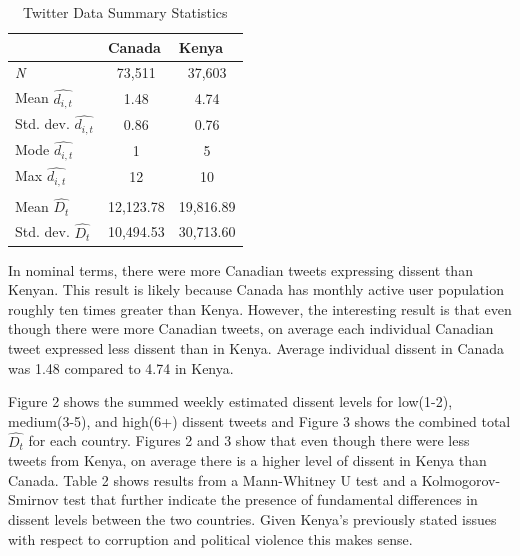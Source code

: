 \documentclass[12pt]{article}
\begin{document}
\begin{spacing}{1.5}
\begin{table}[]
\begin{spacing}{1}
\centering
\begin{tabular}{lcc}
\toprule
\multicolumn{1}{l}{} & \multicolumn{1}{l}{\textbf{Canada}} & \multicolumn{1}{l}{\textbf{Kenya}} \\ \hline
\textit{N} & 73,511 & 37,603 \\
Mean $\hat{d_{i,t}}$ & 1.48 & 4.74 \\
Std. dev. $\hat{d_{i,t}}$ & 0.86 & 0.76 \\
Mode $\hat{d_{i,t}}$ & 1 & 5 \\
Max $\hat{d_{i,t}}$ & 12 & 10 \\
& & \\
Mean $\hat{D_t}$ & 12,123.78 & 19,816.89 \\
Std. dev. $\hat{D_t}$ & 10,494.53 & 30,713.60 \\
\hline
\end{tabular}
\caption{Twitter Data Summary Statistics}
\end{spacing}
\end{table}

In nominal terms, there were more Canadian tweets expressing dissent than Kenyan. This result is likely because Canada has monthly active user population roughly ten times greater than Kenya. However, the interesting result is that even though there were more Canadian tweets, on average each individual Canadian tweet expressed less dissent than in Kenya. Average individual dissent in Canada was 1.48 compared to 4.74 in Kenya. 

Figure 2 shows the summed weekly estimated dissent levels for low(1-2), medium(3-5), and high(6+) dissent tweets and Figure 3 shows the combined total $\hat{D_t}$ for each country. Figures 2 and 3 show that even though there were less tweets from Kenya, on average there is a higher level of dissent in Kenya than Canada. Table 2 shows results from a Mann-Whitney U test and a Kolmogorov-Smirnov test that further indicate the presence of fundamental differences in dissent levels between the two countries. Given Kenya's previously stated issues with respect to corruption and political violence this makes sense. 


\end{spacing}
\end{document}
